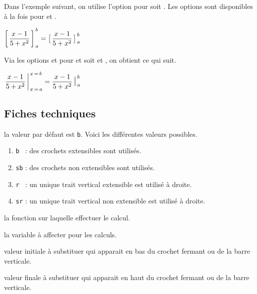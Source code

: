 \documentclass[12pt,a4paper]{article}
\begin{document}



Dans l'exemple suivant, on utilise l'option  pour   soit . Les options sont disponibles à la fois pour  et .


\begin{latexex}
 $\hook*{\dfrac{x - 1}{5 + x^2}}{x}%
        {a}{b}
= \hook*[sb]%
        {\dfrac{x - 1}{5 + x^2}}{x}%
        {a}{b}$
\end{latexex}





Via les options  et  pour  et  soit  et , on obtient ce qui suit.

\begin{latexex}
 $\hook[r]  {\dfrac{x - 1}{5 + x^2}}{x}%
            {a}{b}
= \hook*[sr]{\dfrac{x - 1}{5 + x^2}}{x}%
            {a}{b}$
\end{latexex}




\subsection{Fiches techniques}




\IDoption{} la valeur par défaut est \verb+b+. Voici les différentes valeurs possibles.
\begin{enumerate}
	\item \verb+b + : des crochets extensibles sont utilisés.

	\item \verb+sb+ : des crochets non extensibles sont utilisés.

	\item \verb+r + : un unique trait vertical extensible est utilisé à droite.

	\item \verb+sr+ : un unique trait vertical non extensible est utilisé à droite.
\end{enumerate}

 la fonction sur laquelle effectuer le calcul.

 la variable à affecter pour les calculs.

 valeur initiale à substituer qui apparait en bas du crochet fermant ou de la barre verticale.

 valeur finale à substituer qui apparait en haut du crochet fermant ou de la barre verticale.
\end{document}
